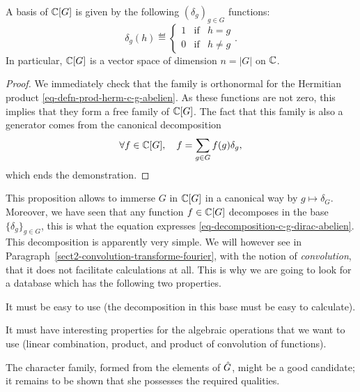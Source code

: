 \begin{prop}
\label{prop-base-c-g}
 A basis of $\mathbb{C}[G]$ is given by the following $(\delta_g)_{g \in G}$ functions:
\begin{equation}
\label{eq-defn-delta-function-g}
\delta_g(h) \eqdef \left\{\begin{array}{lll} 1 & \text{if} & h = g \\0 & \text{if} & h \neq g \end{array} \right. .
\end{equation}
In particular, $\mathbb{C}[G]$ is a vector space of dimension $n = |G|$ on $\mathbb{C}$.
\end{prop}
\begin{proof}
We immediately check that the family is orthonormal for the Hermitian product \eqref{eq-defn-prod-herm-c-g-abelien}. As these functions are not zero, this implies that they form a free family of $\mathbb{C}[G]$. The fact that this family is also a generator comes from the canonical decomposition
\begin{equation}
\label{eq-decomposition-c-g-dirac-abelien}
\forall f \in \mathbb{C}[G], \quad f = \sum_{g \in G}{f(g) \delta_g},
\end{equation}
which ends the demonstration.
\end{proof}
This proposition allows to immerse $G$ in $\mathbb{C}[G]$ in a canonical way by $ g \mapsto \delta_G$. Moreover, we have seen that any function $ f \in \mathbb{C}[G]$ decomposes in the base $\{\delta_g\}_{g \in G}$, this is what the equation expresses \eqref{eq-decomposition-c-g-dirac-abelien}. This decomposition is apparently very simple. We will however see in Paragraph~\ref{sect2-convolution-transforme-fourier}, with the notion of \textit{convolution}, that it does not facilitate calculations at all. This is why we are going to look for a database which has the following two properties. 
\begin{rs}
\item It must be easy to use (the decomposition in this base must be easy to calculate).
\item It must have interesting properties for the algebraic operations that we want to use (linear combination, product, and product of convolution of functions).
\end{rs} 
The character family, formed from the elements of $\hat{G}$, might be a good candidate; it remains to be shown that she possesses the required qualities.

